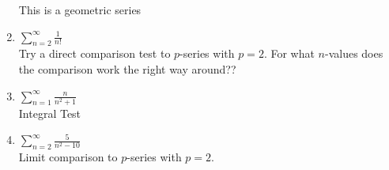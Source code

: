 \documentclass[11pt]{amsart}
\begin{document}
\begin{enumerate}
This is a geometric series
\vfill

\item   \qquad $\displaystyle \sum_{n=2}^\infty \frac{1}{n!}$\\

Try a direct comparison test to $p$-series with $p=2.$ For what $n$-values does the comparison work the right way around??
\vfill

\item   \qquad $\displaystyle \sum_{n=1}^\infty \frac{n}{n^2+1}$\\

Integral Test
\vfill

\item   \qquad $\displaystyle \sum_{n=2}^\infty \frac{5}{n^2-10}$\\

Limit comparison to $p$-series with $p=2.$
\vfill
\newpage
\end{enumerate}
\end{document}
